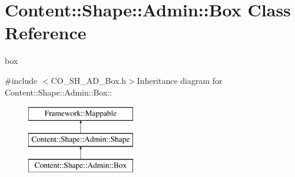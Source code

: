 \hypertarget{classContent_1_1Shape_1_1Admin_1_1Box}{
\section{Content::Shape::Admin::Box Class Reference}
\label{classContent_1_1Shape_1_1Admin_1_1Box}
}


box  


{\ttfamily \#include $<$CO\_\-SH\_\-AD\_\-Box.h$>$}Inheritance diagram for Content::Shape::Admin::Box::\begin{figure}[H]
\begin{center}
\leavevmode
\includegraphics[height=3cm]{classContent_1_1Shape_1_1Admin_1_1Box}
\end{center}
\end{figure}
